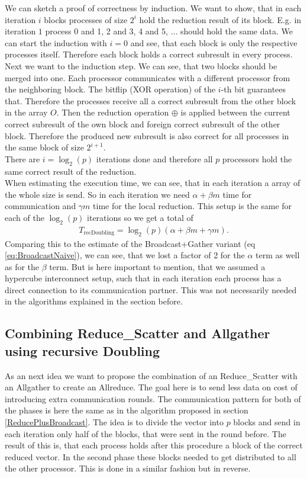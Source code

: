 We can sketch a proof of correctness by induction. We want to show, that in each iteration $i$ blocks processes of size $2^i$ hold the reduction result of its block. E.g. in iteration $1$ process 0 and 1, 2 and 3, 4 and 5, $\dots$ should hold the same data. We can start the induction with $i=0$ and see, that each block is only the respective processes itself. Therefore each block holds a correct subresult in every process. Next we want to the induction step. We can see, that two blocks should be merged into one. Each processor communicates with a different processor from the neighboring block. The bitflip (XOR operation) of the $i$-th bit guarantees that. Therefore the processes receive all a correct subresult from the other block in the array $O$. Then the reduction operation $\oplus$ is applied between the current correct subresult of the own block and foreign correct subresult of the other block. Therefore the produced new subresult is also correct for all processes in the same block of size $2^{i+1}$.\\
There are $i=\log_2(p)$ iterations done and therefore all $p$ processors hold the same correct result of the reduction.\\
When estimating the execution time, we can see, that in each iteration a array of the whole size is send. So in each iteration we need $\alpha + \beta m$ time for communication and $\gamma m$ time for the local reduction. This setup is the same for each of the $\log_2(p)$ iterations so we get a total of
\begin{align*}
	T_\mathrm{recDoubling} = \log_2(p) \left( \alpha + \beta m + \gamma m \right).
\end{align*}
Comparing this to the estimate of the Broadcast+Gather variant (eq \ref{eq:BroadcastNaive}), we can see, that we lost a factor of 2 for the $\alpha$ term as well as for the $\beta$ term. But is here important to mention, that we assumed a hypercube interconnect setup, such that in each iteration each process has a direct connection to its communication partner. This was not necessarily needed in the algorithms explained in the section before.

\subsection{Combining Reduce\_Scatter and Allgather using recursive Doubling}\label{sec:DisseminationAlgo}
As an next idea we want to propose the combination of an Reduce\_Scatter with an Allgather to create an Allreduce. The goal here is to send less data on cost of introducing extra communication rounds. The communication pattern for both of the phases is here the same as in the algorithm proposed in section \ref{ReducePlusBroadcast}. The idea is to divide the vector into $p$ blocks and send in each iteration only half of the blocks, that were sent in the round before. The result of this is, that each process holds after this procedure a block of the correct reduced vector. In the second phase these blocks needed to get distributed to all the other processor. This is done in a similar fashion but in reverse.


